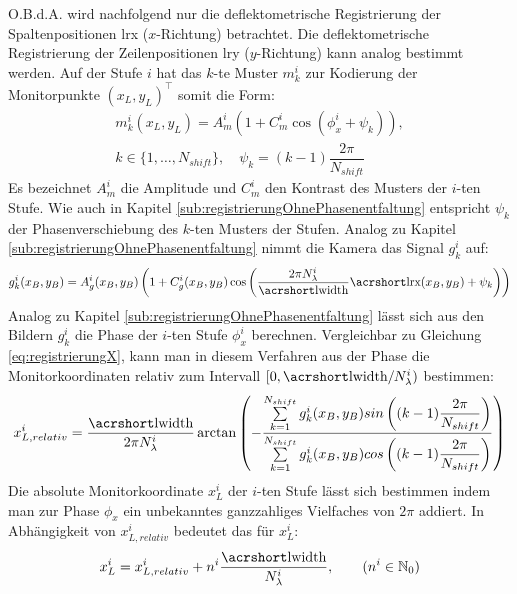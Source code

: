 \p
O.B.d.A. wird nachfolgend nur die deflektometrische Registrierung der Spaltenpositionen \acrshort{lrx} ($x$-Richtung) betrachtet.
Die deflektometrische Registrierung der Zeilenpositionen \acrshort{lry} ($y$-Richtung) kann analog bestimmt werden.
Auf der Stufe $i$ hat das $k$-te Muster $m_k^i$ zur Kodierung der Monitorpunkte $(x_L, y_L)^\top$ somit die Form:
%
\begin{equation}\label{eq:monitormuster_mehrstufig}
	\begin{gathered}	
		m_k^i(x_L,y_L) = A_m^i \left(1 + C_m^i \cos \left(\phi_x^i + \psi_k\right)\right),\\
		k \in \lbrace 1,\ldots,N_{shift}\rbrace,
		\quad
		\psi_k = (k - 1)\dfrac{2\pi}{N_{shift}}
	\end{gathered}
\end{equation}
%
Es bezeichnet $A_m^i$ die Amplitude und $C_m^i$ den Kontrast des Musters der $i$-ten Stufe.
Wie auch in Kapitel \ref{sub:registrierungOhnePhasenentfaltung} entspricht $\psi_k$ der Phasenverschiebung des $k$-ten Musters der Stufen.
Analog zu Kapitel \ref{sub:registrierungOhnePhasenentfaltung} nimmt die Kamera das Signal $g_k^i$ auf:
%
\begin{equation}\label{eq:kamerabild_mehrstufig}
	g_k^i(x_B, y_B) = A_g^i(x_B, y_B) \left(1 + C_g^i(x_B, y_B) \cos \left(\dfrac{2\pi N_\lambda^i}{\acrshortmath{lwidth}}\acrshortmath{lrx}(x_B, y_B) + \psi_k\right)\right)
\end{equation}
%
Analog zu Kapitel \ref{sub:registrierungOhnePhasenentfaltung} lässt sich aus den Bildern $g_k^i$ die Phase der $i$-ten Stufe $\phi_x^i$ berechnen.
Vergleichbar zu Gleichung \ref{eq:registrierungX}, kann man in diesem Verfahren aus der Phase die Monitorkoordinaten relativ zum Intervall $[0,\acrshortmath{lwidth}/N_\lambda^i)$ bestimmen:
%
\begin{equation}\label{eq:registrierungX_relativ}
	x_{L,relativ}^i =
	\dfrac{\acrshortmath{lwidth}}{2\pi N_\lambda^i}
	\arctan 
	\left( 
		-\dfrac
		{\sum\limits_{k=1}^{N_{shift}} g_k^i(x_B, y_B) sin\left((k - 1)\dfrac{2\pi}{N_{shift}}\right)}
		{\sum\limits_{k=1}^{N_{shift}} g_k^i(x_B, y_B) cos\left((k - 1)\dfrac{2\pi}{N_{shift}}\right)}
	\right)
\end{equation}
%
Die absolute Monitorkoordinate $x_L^i$ der $i$-ten Stufe lässt sich bestimmen indem man zur Phase $\phi_x$ ein unbekanntes ganzzahliges Vielfaches von $2\pi$ addiert.
In Abhängigkeit von $x_{L,relativ}^i$ bedeutet das für $x_L^i$:
%
\begin{equation}\label{eq:registrierungX_absolut}
	x_L^i = x_{L,relativ}^i + n^i \dfrac{\acrshortmath{lwidth}}{N_\lambda^i},
	\qquad
	(n^i \in \mathbb{N}_0)
\end{equation}
